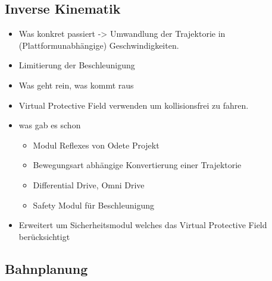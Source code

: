 

\subsection{Inverse Kinematik}
\label{inverse_kinematik_subsec}
\authorsection{\editorjulian}

\begin{itemize}
	\item Was konkret passiert -> Umwandlung der Trajektorie in (Plattformunabhängige) Geschwindigkeiten.
	\item Limitierung der Beschleunigung
	\item Was geht rein, was kommt raus
	\item Virtual Protective Field verwenden um kollisionsfrei zu fahren.
	\item was gab es schon
	\begin{itemize}
		\item Modul Reflexes von Odete Projekt
		\item Bewegungsart abhängige Konvertierung einer Trajektorie
		\item Differential Drive, Omni Drive
		\item Safety Modul für Beschleunigung
	\end{itemize}
	\item Erweitert um Sicherheitsmodul welches das Virtual Protective Field berücksichtigt
\end{itemize}


\subsection{Bahnplanung}
\label{bahnplanung_subsec}
\authorsection{\editortobias}



